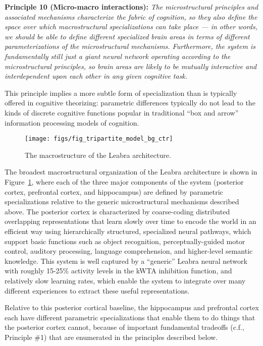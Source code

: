 \documentclass[11pt,twoside]{article}
\begin{document}
{\bf Principle 10 (Micro-macro interactions):} {\em The microstructural
  principles and associated mechanisms characterize the fabric of cognition,
  so they also define the space over which macrostructural specializations can
  take place --- in other words, we should be able to define different
  specialized brain areas in terms of different parameterizations of the
  microstructural mechanisms.  Furthermore, the system is fundamentally still
  just a giant neural network operating according to the microstructural
  principles, so brain areas are likely to be mutually interactive and
  interdependent upon each other in any given cognitive task.}

This principle implies a more subtle form of specialization than is typically
offered in cognitive theorizing: parametric differences typically do not lead
to the kinds of discrete cognitive functions popular in traditional ``box and
arrow'' information processing models of cognition.

\begin{figure}
  \centering\texttt{[image: figs/fig\_tripartite\_model\_bg\_ctr]}
  \caption{\small The macrostructure of the Leabra architecture.}
  \label{fig.tripartite_model}
\end{figure}

The broadest macrostructural organization of the Leabra architecture is shown
in Figure~\ref{fig.tripartite_model}, where each of the three major components
of the system (posterior cortex, prefrontal cortex, and hippocampus) are
defined by parametric specializations relative to the generic microstructural
mechanisms described above.  The posterior cortex is characterized by
coarse-coding distributed overlapping representations that learn slowly over
time to encode the world in an efficient way using hierarchically structured,
specialized neural pathways, which support basic functions such as object
recognition, perceptually-guided motor control, auditory processing, language
comprehension, and higher-level semantic knowledge.  This system is well
captured by a ``generic'' Leabra neural network with roughly 15-25\% activity
levels in the kWTA inhibition function, and relatively slow learning rates,
which enable the system to integrate over many different experiences to
extract these useful representations.

Relative to this posterior cortical baseline, the hippocampus and prefrontal
cortex each have different parametric specializations that enable them to do
things that the posterior cortex cannot, because of important fundamental
tradeoffs (c.f., Principle \#1) that are enumerated in the principles
described below.
\end{document}
